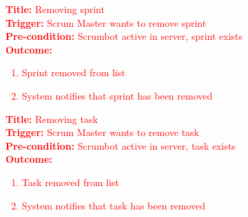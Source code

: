 \documentclass[12pt, titlepage]{article}
\begin{document}
\noindent \textcolor{red}{\textbf{Title: }Removing sprint}\\
\textcolor{red}{\textbf{Trigger: }Scrum Master wants to remove sprint}\\
\textcolor{red}{\textbf{Pre-condition: }Scrumbot active in server, sprint exists}\\
\textcolor{red}{\textbf{Outcome: }}
\textcolor{red}{
\begin{enumerate}
    \item Sprint removed from list
    \item System notifies that sprint has been removed
\end{enumerate}
}

\noindent \textcolor{red}{\textbf{Title: }Removing task}\\
\textcolor{red}{\textbf{Trigger: }Scrum Master wants to remove task}\\
\textcolor{red}{\textbf{Pre-condition: }Scrumbot active in server, task exists}\\
\textcolor{red}{\textbf{Outcome: }}
\textcolor{red}{
\begin{enumerate}
    \item Task removed from list
    \item System notifies that task has been removed
\end{enumerate}
}
\end{document}
